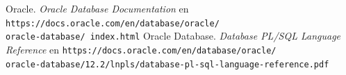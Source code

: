 \documentclass{article}
\begin{document}

\renewcommand\refname{Bibliografía}
\begin{thebibliography}{99}
     Oracle. \textit{Oracle Database Documentation} en 
        \texttt{https://docs.oracle.com/en/database/oracle/\\oracle-database/%
        index.html}
     Oracle Database. \textit{Database PL/SQL Language 
        Reference} en 
        \texttt{https://docs.oracle.com/en/database/oracle/\\
        oracle-database/12.2/lnpls/database-pl-sql-language-reference.pdf}
\end{thebibliography}
\end{document}
